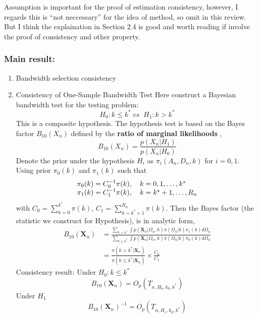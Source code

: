 \documentclass[]{article}
\begin{document}
Assumption is important for the proof of estimation consistency,
however, I regards this is ``not neccessary'' for the idea of method, so
omit in this review. But I think the explaination in Section 2.4 is good
and worth reading if involve the proof of consistency and other
property.

\hypertarget{main-result}{%
\subsubsection{Main result:}\label{main-result}}

\begin{enumerate}
\def\labelenumi{\arabic{enumi}.}
\item
  Bandwidth selection consistency
\item
  Consistency of One-Sample Bandwidth Test Here construct a Bayesian
  bandwidth test for the testing problem: \[
  H_0:k\leqslant k^* \ \textit{vs }\ H_1:k>k^* 
  \] This is a composite hypothesis. The hypothesis test is based on the
  Bayes factor \(B_{10}(X_n)\) defined by the \textbf{ratio of marginal
  likelihoods} , \[
  B_{10}(X_{n})=\frac{p(X_n|H_1)}{p(X_n|H_0)}
  \] Denote the prior under the hypothesis \(H_i\) as
  \(\pi_i(A_n,D_n,k)\) for \(i=0,1.\) Using prior \(\pi_0(k)\) and
  \(\pi_1(k)\) such that \[
  \begin{array} { l l } { \pi _ { 0 } ( k ) = C _ { 0 } ^ { - 1 } \pi ( k ) , \quad k = 0,1 , \ldots , k ^ { * } } \\ { \pi _ { 1 } ( k ) = C _ { 1 } ^ { - 1 } \pi ( k ) , \quad k = k ^ { \star } + 1 , \ldots , R _ { n } } \end{array}
  \] with \(C _ { 0 } = \sum _ { k = 0 } ^ { k ^ { * } } \pi ( k )\),
  \(C _ { 1 } = \sum _ { k = k ^ { * } + 1 } ^ { R _ { n } } \pi ( k )\).
  Then the Bayes factor (the statistic we construct for Hypothesis), is
  in analytic form, \[
  \begin{aligned} B _ { 10 } \left( \mathbf { X } _ { n } \right) & = \frac { \sum _ { k > k ^ { * } } \int p \left( \mathbf { X } _ { n } | \Omega _ { n } , k \right) \pi \left( \Omega _ { n } | k \right) \pi _ { 1 } ( k ) d \Omega _ { n } } { \sum _ { k \leq k ^ { * } } \int p \left( \mathbf { X } _ { n } | \Omega _ { n } , k \right) \pi \left( \Omega _ { n } | k \right) \pi _ { 0 } ( k ) d \Omega _ { n } } \\ & = \frac { \pi \left( k > k ^ { * } | \mathbf { X } _ { n } \right) } { \pi \left( k \leq k ^ { * } | \mathbf { X } _ { n } \right) } \times \frac { C _ { 0 } } { C _ { 1 } } \end{aligned}
  \] Consistency result: Under \(H_0:k\leq k^*\) \[
  B _ { 10 } \left( \mathbf { X } _ { n } \right) = O _ { p } \left( T _ { n , H _ { 0 } , k _ { 0 } , k ^ { * } } \right)
  \] Under \(H_1\) \[
  B _ { 10 } \left( \mathbf { X } _ { n } \right) ^ { - 1 } = O _ { p } \left( T _ { n , H _ { 1 } , k _ { 0 } , k ^ { * } } \right)
  \]
\end{enumerate}
\end{document}
